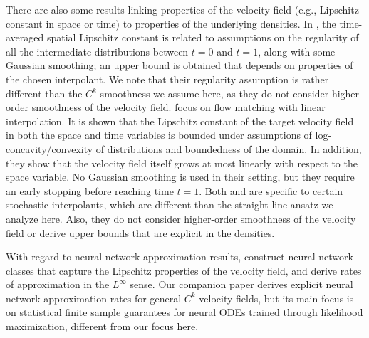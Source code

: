 There are also some results linking properties of the velocity field (e.g., Lipschitz constant in space or time) to properties of the underlying densities. In \citet{BentonErrorBoundsFlowMatching}, the time-averaged spatial Lipschitz constant is related to assumptions on the regularity of all the intermediate distributions between $t=0$ and $t=1$, along with some Gaussian smoothing; an upper bound is obtained that depends on properties of the chosen interpolant. We note that their regularity assumption is rather different than the $C^k$ smoothness we assume here, as they do not consider higher-order smoothness of the velocity field. \citet{GaoConvergenceofContinusNormalizingFlows} focus on flow matching with linear interpolation. It is shown that the Lipschitz constant of the target velocity field in both the space and time variables is bounded under assumptions of log-concavity/convexity of distributions and boundedness of the domain. In addition, they show that the velocity field itself grows at most linearly with respect to the space variable. No Gaussian smoothing is used in their setting, but they require an early stopping before reaching time $t = 1$. Both \citet{BentonErrorBoundsFlowMatching} and \citet{GaoConvergenceofContinusNormalizingFlows} are specific to certain stochastic interpolants, which are different than the straight-line ansatz we analyze here. Also, they do not consider higher-order smoothness of the velocity field or derive upper bounds that are explicit in the densities. 
    
    
    
    
    
    
    
    



With regard to neural network approximation results, \citet{GaoConvergenceofContinusNormalizingFlows}
    construct neural network classes that capture the  Lipschitz properties of the velocity field, and derive rates of approximation in the $L^\infty$ sense. Our companion paper \citep{StatisticalNODE} derives explicit neural network approximation rates for general $C^k$ velocity fields, but its main focus is on statistical finite sample guarantees for neural ODEs trained through likelihood maximization, different from our focus here. 
    

